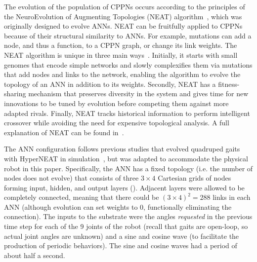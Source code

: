 The evolution of the population of CPPNs occurs according to the
principles of the NeuroEvolution of Augmenting Topologies (NEAT)
algorithm~\citep{stanley2002evolving}, which was originally designed to
evolve ANNs. NEAT can be fruitfully applied to CPPNs because of their
structural similarity to ANNs. For example, mutations can add a node,
and thus a function, to a CPPN graph, or change its link weights. The
NEAT algorithm is unique in three main
ways~\citep{stanley2002evolving}. Initially, it starts with small
genomes that encode simple networks and slowly complexifies them via
mutations that add nodes and links to the network, enabling the
algorithm to evolve the topology of an ANN in addition to its
weights. Secondly, NEAT has a fitness-sharing mechanism that preserves
diversity in the system and gives time for new innovations to be tuned
by evolution before competing them against more adapted
rivals. Finally, NEAT tracks historical information to perform
intelligent crossover while avoiding the need for expensive
topological analysis. A full explanation of NEAT can be found
in~\citep{stanley2002evolving}.
  
\label{hyperneatLayout}

The ANN configuration follows previous studies that evolved quadruped
gaits with HyperNEAT in simulation~\citep{clune2011performance,
  clune2009evolving}, but was adapted to accommodate the physical robot in this paper. Specifically, the ANN has a fixed topology (i.e. the number of nodes does not evolve) that consists of three $3 \times 4$
Cartesian grids of nodes forming input, hidden, and output
layers (). Adjacent layers were allowed to be completely connected, meaning that there
could be $(3 \times 4)^2= 288$ links in each ANN (although evolution can set weights to 0, functionally eliminating the connection). The inputs to the
substrate were the angles \emph{requested} in the previous time step for each of the 9 joints of the robot (recall that gaits are open-loop, so actual joint angles are unknown) and a sine and cosine wave (to facilitate the
production of periodic behaviors).  The sine and cosine waves had a period of about half a second.

